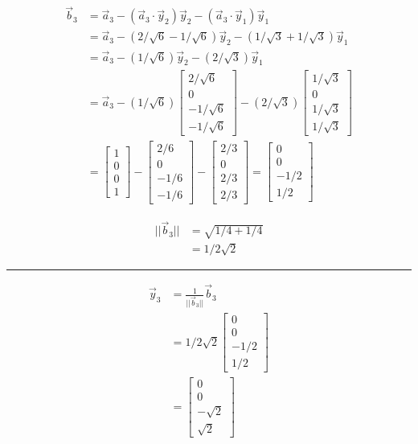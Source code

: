 \documentclass{report}
\begin{document}
\begin{minipage}{0.45\textwidth}
$$
\begin{aligned}
\vec{b}_3&=\vec{a}_3-(\vec{a}_3\cdot\vec{y}_2)\vec{y}_2 - (\vec{a}_3\cdot\vec{y}_1)\vec{y}_1\\
&=\vec{a}_3-(2/\sqrt{6}-1/\sqrt{6})\vec{y}_2-(1/\sqrt{3}+1/\sqrt{3})\vec{y}_1\\
&=\vec{a}_3-(1/\sqrt{6})\vec{y}_2-(2/\sqrt{3})\vec{y}_1\\
&=\vec{a}_3-(1/\sqrt{6})\begin{bmatrix}2/\sqrt{6}\\0\\-1/\sqrt{6}\\-1/\sqrt{6}\end{bmatrix}-(2/\sqrt{3})\begin{bmatrix}1/\sqrt{3}\\0\\1/\sqrt{3}\\1/\sqrt{3}\end{bmatrix}\\
&=\begin{bmatrix}1\\0\\0\\1\end{bmatrix} - \begin{bmatrix}2/6\\0\\-1/6\\-1/6\end{bmatrix} - \begin{bmatrix}2/3\\0\\2/3\\2/3\end{bmatrix} = \begin{bmatrix}0\\0\\-1/2\\1/2\end{bmatrix}
\end{aligned}
$$
\end{minipage}
\begin{minipage}{0.45\textwidth}
$$
\begin{aligned}
||\vec{b}_3|| &= \sqrt{1/4 + 1/4}\\
&=1/2\sqrt{2}
\end{aligned}
$$
\hrule
\vspace{0.5em}
$$
\begin{aligned}
\vec{y}_3&=\frac{1}{||\vec{b}_3||}\vec{b}_3\\
&=1/2\sqrt{2}\begin{bmatrix}0\\0\\-1/2\\1/2\end{bmatrix}\\
&=\begin{bmatrix}0\\0\\-\sqrt{2}\\\sqrt{2}\end{bmatrix}
\end{aligned}
$$
\end{minipage} \\
\end{document}
